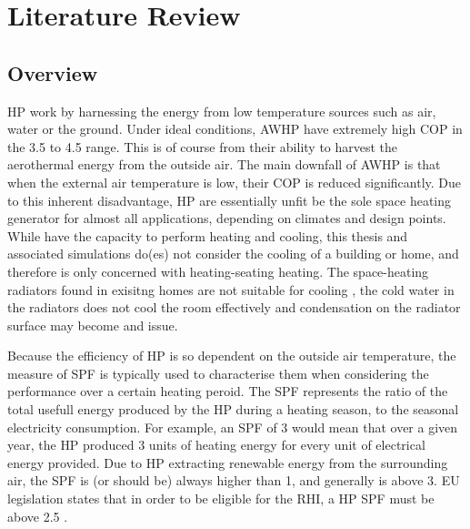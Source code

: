 \chapter{Literature Review}\label{ch:litreview}



\section{Overview}
\acs{HP} work by harnessing the energy from low temperature sources such as air, water or the ground. 
Under ideal conditions, \acs{AWHP} have extremely high \acs{COP} in the \num{3.5} to \num{4.5} range. This is of course from their ability to harvest the aerothermal energy from the outside air. The main downfall of \acs{AWHP} is that when the external air temperature is low, their \ac{COP} is reduced significantly. Due to this inherent disadvantage, \acs{HP} are essentially unfit be the sole space heating generator for almost all applications, depending on climates and design points. While \HPs have the capacity to perform heating and cooling, this thesis and associated simulations do(es) not consider the cooling of a building or home, and therefore is only concerned with heating-seating heating. The space-heating radiators found in exisitng homes are not suitable for cooling \cite{klein_numerical_2014}, the cold water in the radiators does not cool the room effectively and condensation on the radiator surface may become and issue. 

Because the efficiency of \acs{HP} is so dependent on the outside air temperature, the measure of \ac{SPF} is typically used to characterise them when considering the performance over a certain heating peroid. The \ac{SPF} represents the ratio of the total usefull energy produced by the \ac{HP} during a heating season, to the seasonal electricity consumption. For example, an \ac{SPF} of 3 would mean that over a given year, the \ac{HP} produced 3 units of heating energy for every unit of electrical energy provided. Due to \acs{HP} extracting renewable energy from the surrounding air, the \ac{SPF} is (or should be) always higher than 1, and generally is above 3. EU legislation states that in order to be eligible for the \ac{RHI}, a \acs{HP} \ac{SPF} must be above 2.5 \cite{eu-114-2014}. 

